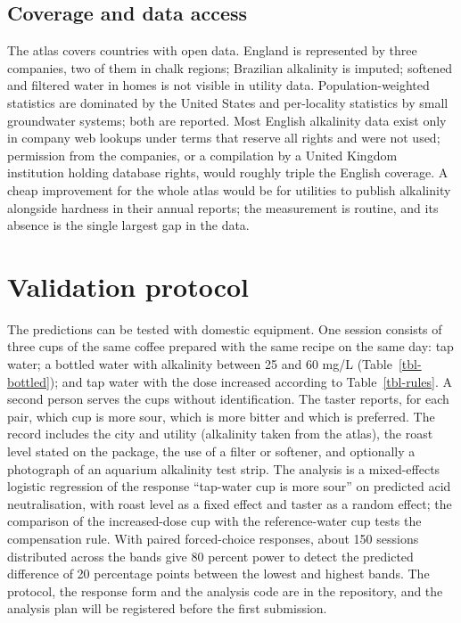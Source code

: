 \documentclass[
  a4paper,
]{article}
\begin{document}
\subsection{Coverage and data access}\label{coverage-and-data-access}

The atlas covers countries with open data. England is represented by
three companies, two of them in chalk regions; Brazilian alkalinity is
imputed; softened and filtered water in homes is not visible in utility
data. Population-weighted statistics are dominated by the United States
and per-locality statistics by small groundwater systems; both are
reported. Most English alkalinity data exist only in company web lookups
under terms that reserve all rights and were not used; permission from
the companies, or a compilation by a United Kingdom institution holding
database rights, would roughly triple the English coverage. A cheap
improvement for the whole atlas would be for utilities to publish
alkalinity alongside hardness in their annual reports; the measurement
is routine, and its absence is the single largest gap in the data.

\section{Validation protocol}\label{sec-protocol}

The predictions can be tested with domestic equipment. One session
consists of three cups of the same coffee prepared with the same recipe
on the same day: tap water; a bottled water with alkalinity between 25
and 60 mg/L (Table~\ref{tbl-bottled}); and tap water with the dose
increased according to Table~\ref{tbl-rules}. A second person serves the
cups without identification. The taster reports, for each pair, which
cup is more sour, which is more bitter and which is preferred. The
record includes the city and utility (alkalinity taken from the atlas),
the roast level stated on the package, the use of a filter or softener,
and optionally a photograph of an aquarium alkalinity test strip. The
analysis is a mixed-effects logistic regression of the response
``tap-water cup is more sour'' on predicted acid neutralisation, with
roast level as a fixed effect and taster as a random effect; the
comparison of the increased-dose cup with the reference-water cup tests
the compensation rule. With paired forced-choice responses, about 150
sessions distributed across the bands give 80 percent power to detect
the predicted difference of 20 percentage points between the lowest and
highest bands. The protocol, the response form and the analysis code are
in the repository, and the analysis plan will be registered before the
first submission.
\end{document}

